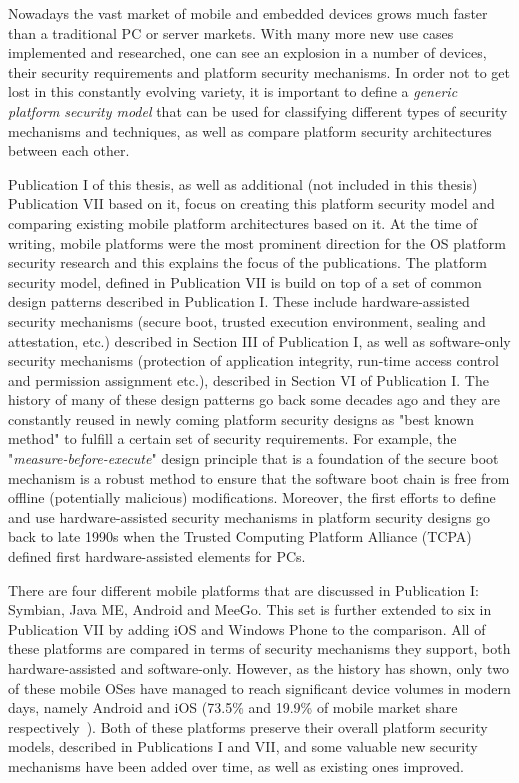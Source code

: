 \begin{quoting}
\end{quoting}

Nowadays the vast market of mobile and embedded devices grows much faster than a traditional PC or server markets. With many more new use cases implemented and researched, one can see an explosion in a number of devices, their security requirements and platform security mechanisms. In order not to get lost in this constantly evolving variety, it is important to define a \textit{generic platform security model} that can be used for classifying different types of security mechanisms and techniques, as well as compare platform security architectures between each other. 

Publication I of this thesis, as well as additional (not included in this thesis) Publication VII based on it, focus on creating this platform security model and comparing existing mobile platform architectures based on it. At the time of writing, mobile platforms were the most prominent direction for the OS platform security research and this explains the focus of the publications. The platform security model, defined in Publication VII is build on top of a set of common design patterns described in Publication I. These include hardware-assisted security mechanisms (secure boot, trusted execution environment, sealing and attestation, etc.) described in Section III of Publication I, as well as software-only security mechanisms (protection of application integrity, run-time access control and permission assignment etc.), described in Section VI of Publication I. The history of many of these design patterns go back some decades ago and they are constantly reused in newly coming platform security designs as "best known method" to fulfill a certain set of security requirements. For example, the "\textit{measure-before-execute}" design principle that is a foundation of the secure boot mechanism is a robust method to ensure that the software boot chain is free from offline (potentially malicious) modifications. Moreover, the first efforts to define and use hardware-assisted security mechanisms in platform security designs go back to late 1990s when the Trusted Computing Platform Alliance (TCPA)~\cite{pearson2002} defined first hardware-assisted elements for PCs.

There are four different mobile platforms that are discussed in Publication I: Symbian, Java ME, Android and MeeGo. This set is further extended to six in Publication VII by adding iOS and Windows Phone to the comparison. All of these platforms are compared in terms of security mechanisms they support, both hardware-assisted and software-only. However, as the history has shown, only two of these mobile OSes have managed to reach significant device volumes in modern days, namely Android and iOS (73.5\% and 19.9\% of mobile market share respectively~\cite{osshare}). Both of these platforms preserve their overall platform security models, described in Publications I and VII, and some valuable new security mechanisms have been added over time, as well as existing ones improved. 

